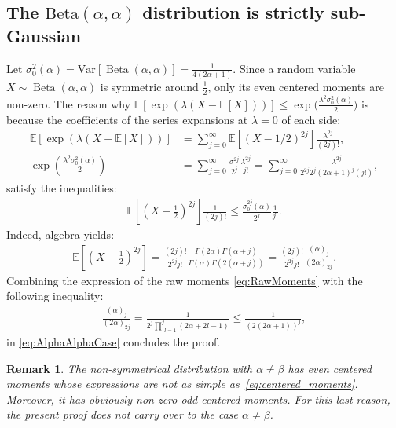 \documentclass[15pt]{article}
\newcommand{\E}{\mathbb{E}}
\def\E{\mathbb{E}}
\DeclareMathOperator{\Beta}{Beta}
\theoremstyle{plain}
\newtheorem{rem}{{Remark}}%
\begin{document}
\subsection{The $\text{Beta}(\alpha,\alpha)$ distribution is strictly sub-Gaussian\label{sec:equal}}
Let $\sigma_0^2(\alpha)=\text{Var}[\Beta(\alpha,\alpha)]=\frac{1}{4(2\alpha+1)}$. Since a random variable $X\sim\Beta(\alpha,\alpha)$ is symmetric around $\frac{1}{2}$, only its even centered moments are non-zero. The reason why $\E[\exp(\lambda(X-\E[X]))]\le\exp\big(\frac{\lambda^2\sigma_0^2(\alpha)}{2}\big)$ is because the coefficients of the series expansions at $\lambda=0$ of each side: 
\begin{align}\label{eq:AlphaAlphaCase}
\E[\exp(\lambda(X-\E[X]))] &= \sum_{j=0}^{\infty} \E\left[(X-1/2)^{2j}\right]\frac{\lambda^{2j}}{(2j)!},\\
\exp\left(\frac{\lambda^2\sigma_0^2(\alpha)}{2}\right)&=\sum_{j=0}^{\infty} \frac{\sigma^{2j}}{2^{j}}\frac{\lambda^{2j}}{j!}=\sum_{j=0}^{\infty} \frac{\lambda^{2j}}{2^{2j}2^j(2\alpha+1)^j (j!)},
\end{align}
satisfy the inequalities:
%
\begin{align}\label{eq:condition}
 \E\left[\left(X-\frac{1}{2}\right)^{2j}\right]\frac{1}{(2j)!} \leq \frac{\sigma_0^{2j}(\alpha)}{2^{j}}\frac{1}{j!}.  
\end{align}
%
Indeed, algebra yields:
%
\begin{align}\label{eq:centered_moments}
 \E\left[\left(X-\frac{1}{2}\right)^{2j}\right] = \frac{(2j)!}{2^{2j}j!}\frac{\Gamma(2\alpha )\Gamma(\alpha +j)}{\Gamma(\alpha )\Gamma(2(\alpha +j))}=\frac{(2j)!}{2^{2j}j!}\frac{(\alpha )_j}{(2\alpha )_{2j}}.
\end{align}
%
Combining the expression of the raw moments \eqref{eq:RawMoments} with the following inequality:
%
\begin{align}%
\frac{(\alpha )_j}{(2\alpha )_{2j}} = \frac{1}{2^j\underset{l=1}{\overset{j}{\prod}}(2\alpha +2l-1)}\leq \frac{1}{(2(2\alpha +1))^j},
\end{align}
%
in \eqref{eq:AlphaAlphaCase} concludes the proof.

\begin{rem}
The non-symmetrical distribution with $\alpha\neq\beta$ has even centered moments whose expressions are not as simple as~\eqref{eq:centered_moments}. Moreover, it has obviously non-zero odd centered moments. For this last reason, the present proof does not carry over to the case $\alpha\neq \beta$.
\end{rem}
\end{document}
